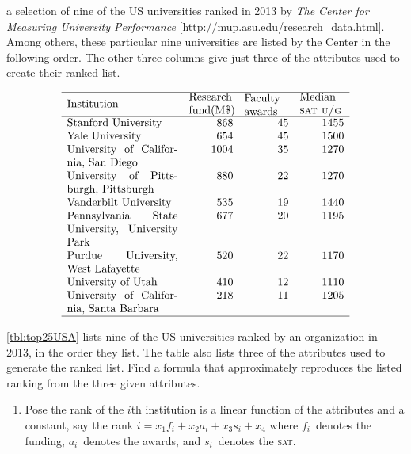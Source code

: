 \begin{exercise} \label{ex:top25USA} 
\begin{table}
\caption{a selection of nine of the US universities ranked in 2013 by \emph{The Center for Measuring University Performance} [\url{http://mup.asu.edu/research_data.html}].  
Among others, these particular nine universities are listed by the Center in the following order.  
The other three columns give just three of the attributes used to create their ranked list.}
\label{tbl:top25USA}
\begin{equation*}
\begin{array}{p{10em}rrr}
\hline
Institution& 
\parbox{4em}{\raggedright Research fund(M\$)}& 
\parbox{4em}{\raggedright Faculty awards} & 
\parbox{4em}{\raggedright Median \textsc{sat u/g}}\\
\hline
Stanford University&868&45&1455\\
Yale University&654&45&1500\\
University of California, San Diego&1004&35&1270\\
University of Pittsburgh, Pittsburgh&880&22&1270\\
Vanderbilt University&535&19&1440\\
Pennsylvania State University, University Park&677&20&1195\\
Purdue University, West Lafayette&520&22&1170\\
University of Utah&410&12&1110\\
University of California, Santa Barbara&218&11&1205\\
\hline
\end{array}
\end{equation*}
\end{table}%
\autoref{tbl:top25USA} lists nine of the US universities ranked by an organization in 2013, in the order they list.
The table also lists three of the attributes used to generate the ranked list.
Find a formula that approximately reproduces the listed ranking from the three given attributes.
\begin{enumerate}
\item Pose the rank of the \(i\)th institution is a linear function of the attributes and a constant, say the rank \(i=x_1f_i+x_2a_i+x_3s_i+x_4\) where \(f_i\)~denotes the funding, \(a_i\)~denotes the awards, and \(s_i\)~denotes the \textsc{sat}.

\end{enumerate}
\end{exercise}

